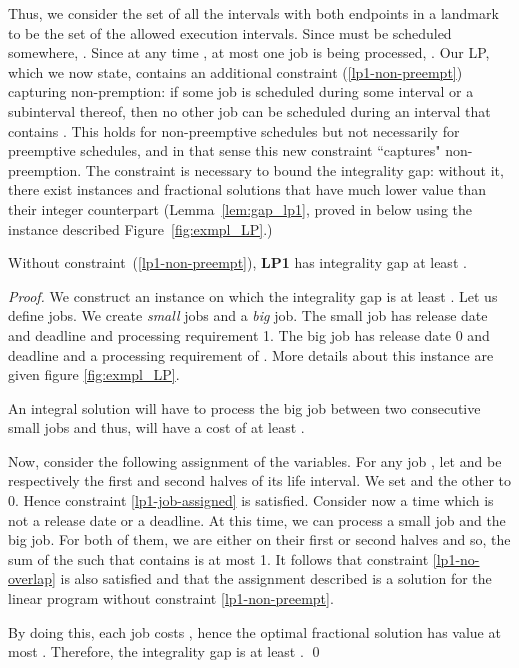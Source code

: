 Thus, we consider the set   of all the  intervals with both endpoints in a landmark to be   the set of the allowed execution intervals.
Since  must be scheduled somewhere, . Since at any time , at most one job is being processed, 
. Our LP, which we now state, contains an additional constraint (\ref{lp1-non-preempt}) capturing non-premption:
if some job  is scheduled  during some interval  or a subinterval thereof, then no other job can be scheduled during an interval that contains . This holds for non-preemptive schedules but not necessarily for preemptive schedules, and in that sense this new constraint ``captures" non-preemption. The constraint is necessary to bound the integrality gap: without it, there exist instances and  fractional solutions that have much lower value than their integer counterpart (Lemma~\ref{lem:gap_lp1}, proved in below using  the instance described Figure~\ref{fig:exmpl_LP}.)   




\begin{lem}\label{lem:gap_lp1}
Without constraint~(\ref{lp1-non-preempt}), \textbf{LP1} has integrality gap at least .
\end{lem}
\begin{proof}
We construct an instance on which the integrality gap is at least .
Let us define  jobs. We create  \emph{small} jobs and a \emph{big} job.
The  small job has release date  and deadline  and processing requirement 1.
The big job has release date 0 and deadline  and a processing requirement of .
More details about this instance are given figure \ref{fig:exmpl_LP}.

An integral solution will have to process the big job between two consecutive small jobs and thus,
will have a cost of at least .

Now, consider the following assignment of the variables. For any job , let  and  be respectively the
first and second halves of its life interval.
We set  and the other  to 0. Hence constraint \ref{lp1-job-assigned} is satisfied.
Consider now a time  which is not a release date or a deadline. At this time, we can process a small job and the big job.
For both of them, we are either on their first or second halves and so, the sum of the  such that  contains  is
at most 1. It follows that constraint \ref{lp1-no-overlap} is also satisfied and that the assignment described is a solution for
the linear program without constraint \ref{lp1-non-preempt}.

By doing this, each job costs , hence the optimal fractional solution has value at most .
Therefore, the integrality gap is at least .
\qed\end{proof}


